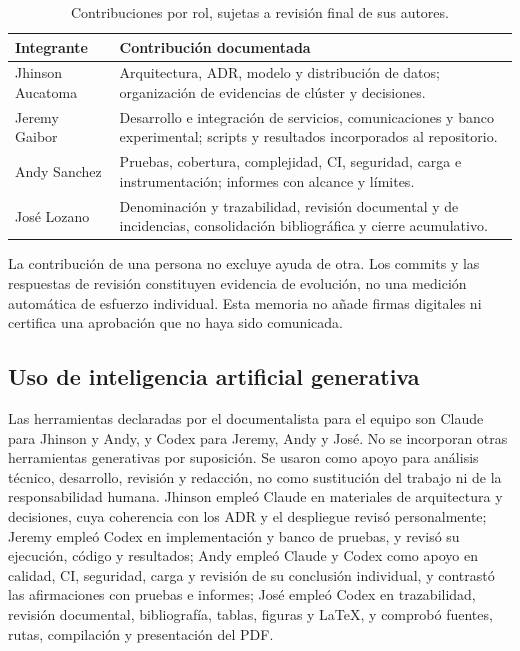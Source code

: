 \documentclass[12pt,a4paper]{article}
\begin{document}
\begin{table}[H]\centering\small
\caption{Contribuciones por rol, sujetas a revisión final de sus autores.}\label{tab:contribuciones}
\begin{tabularx}{\textwidth}{lX}
\toprule Integrante & Contribución documentada\\\midrule
Jhinson Aucatoma & Arquitectura, ADR, modelo y distribución de datos; organización de evidencias de clúster y decisiones.\\
Jeremy Gaibor & Desarrollo e integración de servicios, comunicaciones y banco experimental; scripts y resultados incorporados al repositorio.\\
Andy Sanchez & Pruebas, cobertura, complejidad, CI, seguridad, carga e instrumentación; informes con alcance y límites.\\
José Lozano & Denominación y trazabilidad, revisión documental y de incidencias, consolidación bibliográfica y cierre acumulativo.\\\bottomrule
\end{tabularx}
\end{table}
La contribución de una persona no excluye ayuda de otra. Los commits y las respuestas de revisión constituyen evidencia de evolución, no una medición automática de esfuerzo individual. Esta memoria no añade firmas digitales ni certifica una aprobación que no haya sido comunicada.

\subsection{Uso de inteligencia artificial generativa}
Las herramientas declaradas por el documentalista para el equipo son Claude para Jhinson y Andy, y Codex para Jeremy, Andy y José. No se incorporan otras herramientas generativas por suposición. Se usaron como apoyo para análisis técnico, desarrollo, revisión y redacción, no como sustitución del trabajo ni de la responsabilidad humana. Jhinson empleó Claude en materiales de arquitectura y decisiones, cuya coherencia con los ADR y el despliegue revisó personalmente; Jeremy empleó Codex en implementación y banco de pruebas, y revisó su ejecución, código y resultados; Andy empleó Claude y Codex como apoyo en calidad, CI, seguridad, carga y revisión de su conclusión individual, y contrastó las afirmaciones con pruebas e informes; José empleó Codex en trazabilidad, revisión documental, bibliografía, tablas, figuras y LaTeX, y comprobó fuentes, rutas, compilación y presentación del PDF.
\end{document}
